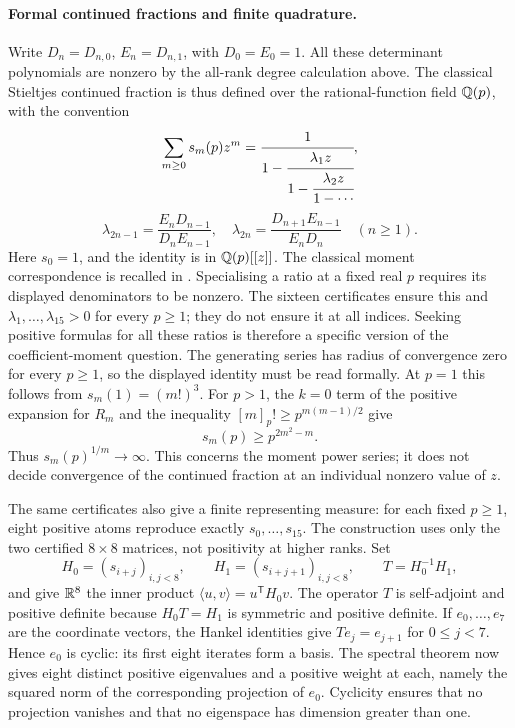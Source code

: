 \documentclass[11pt]{article}
\begin{document}
\paragraph{Formal continued fractions and finite quadrature.}
Write $D_n=D_{n,0}$, $E_n=D_{n,1}$, with $D_0=E_0=1$.
All these determinant polynomials are nonzero by the all-rank degree
calculation above. The classical Stieltjes continued fraction is thus
defined over the rational-function field $\mathbb{Q}(p)$, with the convention
\[
 \sum_{m\ge0}s_m(p)z^m
 =\cfrac{1}{1-\cfrac{\lambda_1z}{1-\cfrac{\lambda_2z}{1-\cdots}}},
\]
\[
 \lambda_{2n-1}=\frac{E_nD_{n-1}}{D_nE_{n-1}},\quad
 \lambda_{2n}=\frac{D_{n+1}E_{n-1}}{E_nD_n}\quad(n\ge1).
\]
Here $s_0=1$, and the identity is in $\mathbb{Q}(p)[[z]]$. The classical
moment correspondence is recalled in \cite[pp.~1--2]{sw2024}.
Specialising a ratio at a fixed real $p$ requires its displayed
denominators to be nonzero. The sixteen certificates ensure this and
$\lambda_1,\ldots,\lambda_{15}>0$ for every $p\ge1$; they do not ensure
it at all indices. Seeking positive formulas for all these ratios is
therefore a specific version of the coefficient-moment question.
The generating series has radius of convergence zero for every
$p\ge1$, so the displayed identity must be read formally. At $p=1$
this follows from $s_m(1)=(m!)^3$. For $p>1$, the $k=0$ term of the
positive expansion for $R_m$ and the inequality
$[m]_p!\ge p^{m(m-1)/2}$ give
\[
 s_m(p)\ge p^{2m^2-m}.
\]
Thus $s_m(p)^{1/m}\to\infty$. This concerns the moment power series;
it does not decide convergence of the continued fraction at an
individual nonzero value of $z$.

The same certificates also give a finite representing measure:
for each fixed $p\ge1$, eight positive atoms reproduce exactly
$s_0,\ldots,s_{15}$. The construction uses only the two certified
$8\times8$ matrices, not positivity at higher ranks. Set
\[
 H_0=(s_{i+j})_{i,j<8},\qquad H_1=(s_{i+j+1})_{i,j<8},\qquad
 T=H_0^{-1}H_1,
\]
and give $\mathbb{R}^8$ the inner product
$\langle u,v\rangle=u^{\mathsf T}H_0v$.
The operator $T$ is self-adjoint and positive definite because
$H_0T=H_1$ is symmetric and positive definite. If $e_0,\ldots,e_7$
are the coordinate vectors, the Hankel identities give
$Te_j=e_{j+1}$ for $0\le j<7$. Hence $e_0$ is cyclic: its first
eight iterates form a basis. The spectral theorem now gives eight
distinct positive eigenvalues and a positive weight at each, namely
the squared norm of the corresponding projection of $e_0$.
Cyclicity ensures that no projection vanishes and that no eigenspace
has dimension greater than one.
\end{document}
